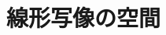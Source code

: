 \documentclass[../../topic_linear-algebra]{subfiles}
\begin{document}

\chapter{線形写像の空間}\label{ch:homomorphism-space}


\end{document}
